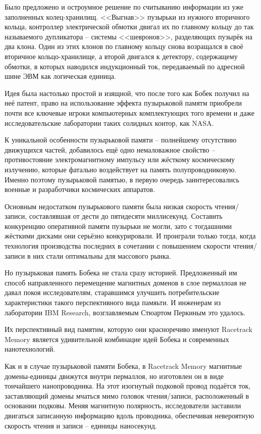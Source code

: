Было предложено и остроумное решение по считыванию информации из уже 
заполненных колец-хранилищ. <<Выгнав>> пузырьки из нужного вторичного 
кольца, контроллер электрической обмотки двигал их по главному кольцу до 
так называемого дупликатора -- системы <<шевронов>>, разделяющих 
пузырёк на два клона. Один из этих клонов по главному кольцу снова 
возращался в своё вторичное кольцо-хранилище, а второй двигался к 
детектору, содержащему обмотки, в которых наводился индукционный ток, 
передаваемый по адресной шине ЭВМ как логическая единица.

Идея была настолько простой и изящной, что после того как Бобек получил 
на неё патент, право на использование эффекта пузырьковой памятм 
приобрели почти все ключевые игроки компьютерных комплектующих того 
времени и даже исследовательские лаборатории таких солидных контор, как 
NASA.

К уникальной особенности пузырьковой памяти -- полнейшему отсутствию 
движущихся частей, добавилось ещё одно немаловажное свойство -- 
противостояние электромагнитному импульсу или жёсткому космическому 
излучению, которые фатально воздействует на память полупроводниковую. 
Именно поэтому пузырьковой памятью, в первую очередь заинтересовались 
военные и разработчики космических аппаратов. 

Основным недостатком пузырькового памяти была низкая скорость 
чтения/записи, составлявшая от дести до пятидесяти миллисекунд. Составить 
конкуренцию оперативной памяти пузырьки не могли, зато с тогдашними 
жёсткими дисками они серьёзно конкурировали. И проиграли только тогда, 
когда технология производства последних в сочетании с повышением 
скорости чтения/записи в них стали оптимальны для массового рынка.

Но пузырьковая память Бобека не стала сразу историей. Предложенный им 
способ направленного перемещение магнитных доменов в слое пермаллоая не 
давал покоя исследователям, старавшимся улучшить потребительские 
характеристики такого перспективного вида памяьти. И инженерам из 
лаборатории IBM Research, возглавляемым Стюартом Перкиным это удалось.

Их перспективный вид памятим, которую они красноречиво именуют 
Racetrack Memory является удивительной комбинацие идей Бобека и 
современных нанотехнологий.

Как и в случае пузырьковой памяти Бобека, в Racetrack Memory магнитные 
домены-единицы движутся внутри пермаллоя, но изготовлен он в виде 
тончайшего нанопроводника. На этот изогнутый подковой провод подаётся ток, 
заставляющий домены мчаться мимо головок чтения/записи, расположенный в 
основании подковы. Меняя магнитную полярность, исследователи заставили 
двигаться записанную информацию вдоль проводника, обеспечивая 
невероятную скорость чтения и записи -- единицы наносекунд.

